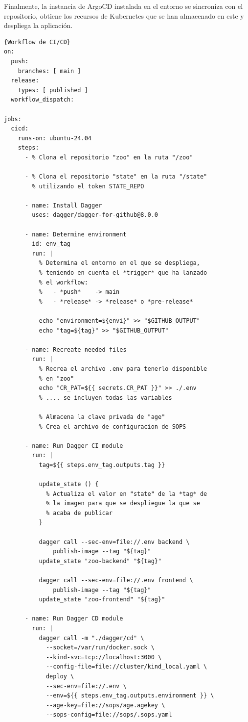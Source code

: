 Finalmente, la instancia de ArgoCD instalada en el entorno se sincroniza con el repositorio, obtiene los recursos de Kubernetes que se han almacenado en este y despliega la aplicación.

\begin{lstlisting}[language=workflows,label=lst:workflowcicd]{Workflow de CI/CD}
on:
  push:
    branches: [ main ]
  release:
    types: [ published ]
  workflow_dispatch:

jobs:
  cicd:
    runs-on: ubuntu-24.04
    steps:
      - % Clona el repositorio "zoo" en la ruta "/zoo"

      - % Clona el repositorio "state" en la ruta "/state"
        % utilizando el token STATE_REPO

      - name: Install Dagger
        uses: dagger/dagger-for-github@8.0.0

      - name: Determine environment
        id: env_tag
        run: |
          % Determina el entorno en el que se despliega,
          % teniendo en cuenta el *trigger* que ha lanzado
          % el workflow:
          %   - *push*    -> main
          %   - *release* -> *release* o *pre-release*

          echo "environment=${envi}" >> "$GITHUB_OUTPUT"
          echo "tag=${tag}" >> "$GITHUB_OUTPUT"

      - name: Recreate needed files
        run: |
          % Recrea el archivo .env para tenerlo disponible
          % en "zoo"
          echo "CR_PAT=${{ secrets.CR_PAT }}" >> ./.env
          % .... se incluyen todas las variables

          % Almacena la clave privada de "age"
          % Crea el archivo de configuracion de SOPS

      - name: Run Dagger CI module
        run: |
          tag=${{ steps.env_tag.outputs.tag }} 

          update_state () {
            % Actualiza el valor en "state" de la *tag* de
            % la imagen para que se despliegue la que se
            % acaba de publicar
          }

          dagger call --sec-env=file://.env backend \
              publish-image --tag "${tag}"
          update_state "zoo-backend" "${tag}"

          dagger call --sec-env=file://.env frontend \
              publish-image --tag "${tag}"
          update_state "zoo-frontend" "${tag}"

      - name: Run Dagger CD module
        run: |
          dagger call -m "./dagger/cd" \
            --socket=/var/run/docker.sock \
            --kind-svc=tcp://localhost:3000 \
            --config-file=file://cluster/kind_local.yaml \
            deploy \
            --sec-env=file://.env \
            --env=${{ steps.env_tag.outputs.environment }} \
            --age-key=file://sops/age.agekey \
            --sops-config=file://sops/.sops.yaml
\end{lstlisting}

